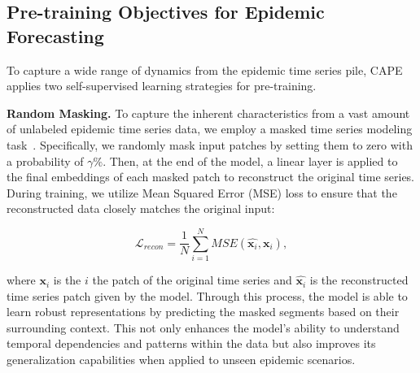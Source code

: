 \subsection{Pre-training Objectives for Epidemic Forecasting}
\label{sec: contrast}
To capture a wide range of dynamics from the epidemic time series pile, CAPE applies two self-supervised learning strategies for pre-training. 


\noindent\textbf{Random Masking.}  To capture the inherent characteristics from a vast amount of unlabeled epidemic time series data, we employ a masked time series modeling task~\cite{kamarthi2023pems, goswami2024moment}. Specifically, we randomly mask input patches by setting them to zero with a probability of $\gamma \%$. Then, at the end of the model, a linear layer is applied to the final embeddings of each masked patch to reconstruct the original time series. During training, we utilize Mean Squared Error (MSE) loss to ensure that the reconstructed data closely matches the original input:

\[
\mathcal{L}_{recon} = \frac{1}{N}\sum_{i=1}^{N} MSE(\hat{\mathbf{x}_i}, \mathbf{x}_i) , \tag{12}
\]

where $\mathbf{x}_i$ is the $i$ the patch of the original time series and $\hat{\mathbf{x}_i}$ is the reconstructed time series patch given by the model.
Through this process, the model is able to learn robust representations by predicting the masked segments based on their surrounding context. This not only enhances the model's ability to understand temporal dependencies and patterns within the data but also improves its generalization capabilities when applied to unseen epidemic scenarios. 



